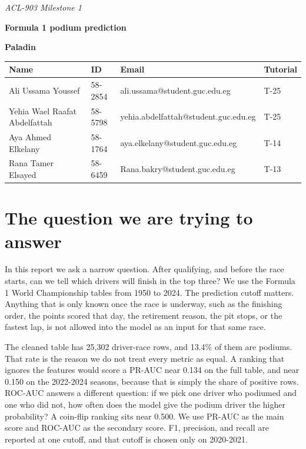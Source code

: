 \documentclass[10pt,a4paper]{article}
\renewcommand{\arraystretch}{1.12}
\begin{document}
\sloppy
\thispagestyle{empty}
\vspace*{0.17\textheight}
\begin{center}
{\itshape\color{muted}\large ACL-903 Milestone 1\par}
\vspace{8pt}
{\fontsize{27}{31}\selectfont\bfseries\color{navy} Formula 1 podium prediction\par}
\vspace{8pt}
\vspace{22pt}
{\LARGE\bfseries\color{navy} Paladin\par}
\vspace{14pt}
{\small\setlength{\tabcolsep}{9pt}\renewcommand{\arraystretch}{1.35}
\begin{tabular}{llll}
\toprule
\textbf{Name} & \textbf{ID} & \textbf{Email} & \textbf{Tutorial} \\
\midrule
Ali Ussama Youssef & 58-2854 & ali.ussama@student.guc.edu.eg & T-25 \\
Yehia Wael Raafat Abdelfattah & 58-5798 & yehia.abdelfattah@student.guc.edu.eg & T-25 \\
Aya Ahmed Elkelany & 58-1764 & aya.elkelany@student.guc.edu.eg & T-14 \\
Rana Tamer Elsayed & 58-6459 & Rana.bakry@student.guc.edu.eg & T-13 \\
\bottomrule
\end{tabular}}
\end{center}
\clearpage



\section{The question we are trying to answer}


In this report we ask a narrow question. After qualifying, and before the race starts, can we tell which drivers will finish in the top three? We use the Formula 1 World Championship tables from 1950 to 2024. The prediction cutoff matters. Anything that is only known once the race is underway, such as the finishing order, the points scored that day, the retirement reason, the pit stops, or the fastest lap, is not allowed into the model as an input for that same race.


The cleaned table has 25,302 driver-race rows, and 13.4\% of them are podiums. That rate is the reason we do not treat every metric as equal. A ranking that ignores the features would score a PR-AUC near 0.134 on the full table, and near 0.150 on the 2022-2024 seasons, because that is simply the share of positive rows. ROC-AUC answers a different question: if we pick one driver who podiumed and one who did not, how often does the model give the podium driver the higher probability? A coin-flip ranking sits near 0.500. We use PR-AUC as the main score and ROC-AUC as the secondary score. F1, precision, and recall are reported at one cutoff, and that cutoff is chosen only on 2020-2021.
\end{document}
